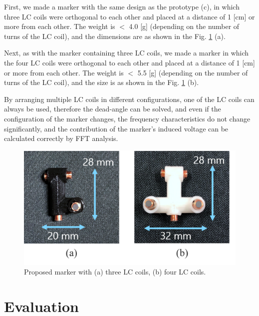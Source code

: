 \documentclass[journal,twoside,web]{ieeecolor}
\begin{document}
First, we made a marker with the same design as the prototype (c), in which three LC coils were orthogonal to each other and placed at a distance of 1 [cm] or more from each other. The weight is $<$ 4.0 [g] (depending on the number of turns of the LC coil), and the dimensions are as shown in the Fig. \ref{marker_size} (a). 

Next, as with the marker containing three LC coils, we made a marker in which the four LC coils were orthogonal to each other and placed at a distance of 1 [cm] or more from each other. The weight is $<$ 5.5 [g] (depending on the number of turns of the LC coil), and the size is as shown in the Fig. \ref{marker_size} (b). 

By arranging multiple LC coils in different configurations, one of the LC coils can always be used, therefore the dead-angle can be solved, and even if the configuration of the marker changes, the frequency characteristics do not change significantly, and the contribution of the marker's induced voltage can be calculated correctly by FFT analysis.

\begin{figure}[!t]
    \centerline{\includegraphics[width=\columnwidth]{figure/marker_size.png}}
    \caption{Proposed marker with (a) three LC coils, (b) four LC coils.}
    \label{marker_size}
\end{figure}

\section{Evaluation}
\end{document}
